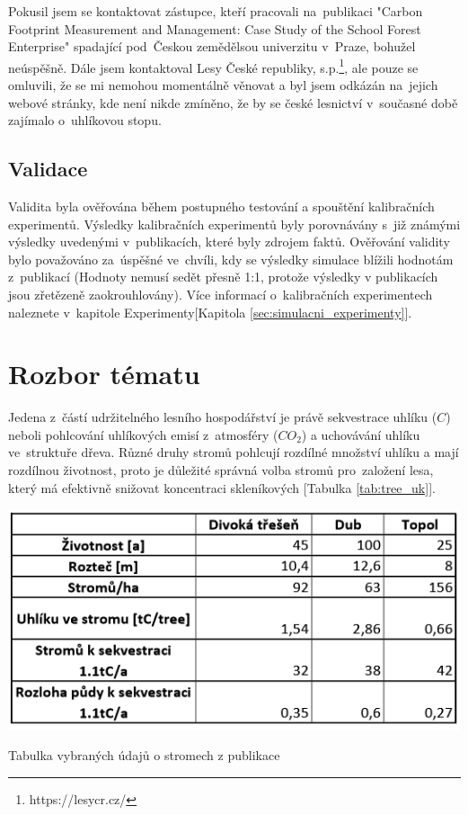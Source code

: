 \documentclass[a4paper, 11pt, titlepage]{article}
\begin{document}
Pokusil jsem se kontaktovat zástupce, kteří pracovali na~publikaci "Carbon Footprint Measurement and Management: Case Study of the School Forest Enterprise"\cite{School_Forest_Enterprise} spadající pod~Českou zemědělsou univerzitu v~Praze, bohužel neúspěšně.
Dále jsem kontaktoval Lesy České republiky, s.p.\footnote{https://lesycr.cz/}, ale pouze se omluvili, že se mi nemohou momentálně věnovat a byl jsem odkázán na~jejich webové stránky, kde není nikde zmíněno, že by se české lesnictví v~současné době zajímalo o~uhlíkovou stopu. 

\subsection{Validace}

Validita\cite[snímek 37]{IMS_prez} byla ověřována během postupného testování a spouštění kalibračních experimentů. Výsledky kalibračních experimentů byly porovnávány s~již známými výsledky uvedenými v~publikacích, které byly zdrojem faktů.
Ověřování validity bylo považováno za~úspěšné ve~chvíli, kdy se výsledky simulace\cite[snímek 33]{IMS_prez} blížili hodnotám z~publikací (Hodnoty nemusí sedět přesně 1:1, protože výsledky v publikacích jsou zřetězeně zaokrouhlovány).
Více informací o~kalibračních experimentech naleznete v~kapitole Experimenty[Kapitola \ref{sec:simulacni_experimenty}].

\newpage
\section{Rozbor tématu} \label{sec:rozbor_tematu}

Jedena z~částí udržitelného lesního hospodářství je právě sekvestrace uhlíku ($C$) neboli pohlcování uhlíkových emisí z~atmosféry ($CO_2$) a uchovávání uhlíku ve~struktuře dřeva\cite{Carbon_in_Wood}. 
Různé druhy stromů pohlcují rozdílné množství uhlíku a mají rozdílnou životnost, proto je důležité správná volba stromů pro~založení lesa, který má efektivně snižovat koncentraci skleníkových [Tabulka \ref{tab:tree_uk}].\cite{Growing_Tree_in_UK}


\begin{table}[h]
    \centering
    \includegraphics[scale=1]{assets/tab_stromy.PNG}
    \caption{Tabulka vybraných údajů o stromech z publikace\cite{Growing_Tree_in_UK}}
    \label{tab:tree_uk}
\end{table}
\end{document}
